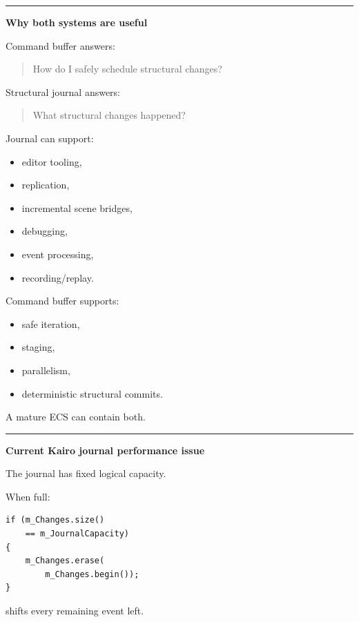 \begin{center}\rule{0.5\linewidth}{0.5pt}\end{center}

\textbf{Why both systems are useful}

Command buffer answers:

\begin{quote}
How do I safely schedule structural changes?
\end{quote}

Structural journal answers:

\begin{quote}
What structural changes happened?
\end{quote}

Journal can support:

\begin{itemize}
\tightlist
\item
  editor tooling,
\item
  replication,
\item
  incremental scene bridges,
\item
  debugging,
\item
  event processing,
\item
  recording/replay.
\end{itemize}

Command buffer supports:

\begin{itemize}
\tightlist
\item
  safe iteration,
\item
  staging,
\item
  parallelism,
\item
  deterministic structural commits.
\end{itemize}

A mature ECS can contain both.

\begin{center}\rule{0.5\linewidth}{0.5pt}\end{center}

\textbf{Current Kairo journal performance issue}

The journal has fixed logical capacity.

When full:

\begin{verbatim}
if (m_Changes.size()
    == m_JournalCapacity)
{
    m_Changes.erase(
        m_Changes.begin());
}
\end{verbatim}

 shifts every remaining event left.

